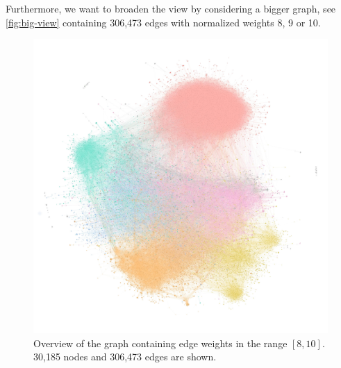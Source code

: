 Furthermore, we want to broaden the view by considering a bigger graph, see \autoref{fig:big-view} containing 306,473 edges with normalized weights 8, 9 or 10.


\vfill\null

\begin{figure}[H]
    \centering
    \includegraphics[width=\linewidth, trim=1cm 4.8cm 0.5cm 3.2cm, clip]{assets/big view-min-min.jpg}
    \caption{Overview of the graph containing edge weights in the range $[8,10]$. 30,185 nodes and 306,473 edges are shown.}
    \label{fig:big-view}
\end{figure}







